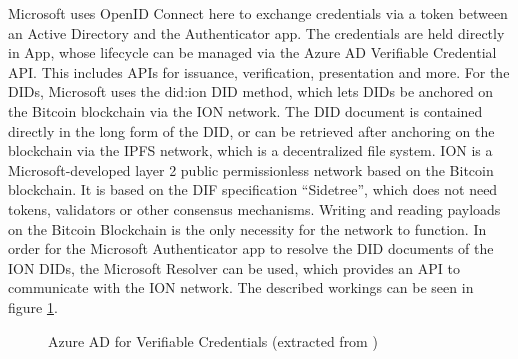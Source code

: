     Microsoft uses OpenID Connect here to exchange credentials via a token between an Active Directory and the Authenticator app. The credentials are held directly in App, whose lifecycle can be managed via the Azure AD Verifiable Credential API. This includes APIs for issuance, verification, presentation and more. For the \acp{DID}, Microsoft uses the did:ion \ac{DID} method, which lets \acp{DID} be anchored on the Bitcoin blockchain via the ION network. The \ac{DID} document is contained directly in the long form of the \ac{DID}, or can be retrieved after anchoring on the blockchain via the IPFS network, which is a decentralized file system. ION is a Microsoft-developed layer 2 public permissionless network based on the Bitcoin blockchain. It is based on the DIF specification “Sidetree”, which does not need tokens, validators or other consensus mechanisms. Writing and reading payloads on the Bitcoin Blockchain is the only necessity for the network to function. In order for the Microsoft Authenticator app to resolve the \ac{DID} documents of the ION \acp{DID}, the Microsoft Resolver can be used, which provides an API to communicate with the ION network. The described workings can be seen in figure \ref{figure: azure ad}. \cite{neira_introduction_2021}
    
    \begin{figure}[ht]
	    \centering    	   
	    \makebox[\textwidth]{}
        \caption{Azure AD for Verifiable Credentials (extracted from \cite{neira_introduction_2021})}
        \label{figure: azure ad}
    \end{figure}
    
